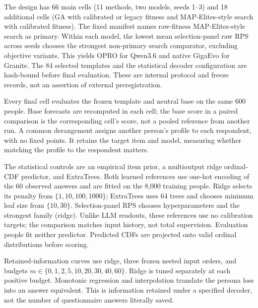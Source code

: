 \documentclass[10pt,twocolumn]{article}
\begin{document}
The design has 66 main cells (11 methods, two models, seeds 1--3) and 18
additional cells (GA with calibrated or legacy fitness and MAP-Elites-style
search with calibrated fitness). The fixed manifest names raw-fitness
MAP-Elites-style search as primary. Within each model, the lowest mean
selection-panel raw RPS across seeds chooses the strongest non-primary search
comparator, excluding objective variants. This yields OPRO for Qwen3.6 and
native GigaEvo for Granite. The 84 selected templates and the statistical
decoder configuration are hash-bound before final evaluation. These are
internal protocol and freeze records, not an assertion of external
preregistration.

Every final cell evaluates the frozen template and neutral base on the same
600 people. Base forecasts are recomputed in each cell; the base score in a
paired comparison is the corresponding cell's score, not a pooled reference
from another run. A common derangement assigns another person's profile to
each respondent, with no fixed points. It retains the target item and model,
measuring whether matching the profile to the respondent matters.

The statistical controls are an empirical item prior, a multioutput ridge
ordinal-CDF predictor, and ExtraTrees. Both learned references use one-hot
encoding of the 60 observed answers and are fitted on the 8,000 training
people. Ridge selects its penalty from $\{1,10,100,1000\}$; ExtraTrees uses
64 trees and chooses minimum leaf size from $\{10,30\}$. Selection-panel RPS
chooses hyperparameters and the strongest family (ridge). Unlike LLM readouts,
these references use no calibration targets; the comparison matches input
history, not total supervision. Evaluation people fit neither predictor.
Predicted CDFs are projected onto valid ordinal distributions before scoring.

Retained-information curves use ridge, three frozen nested input orders,
and budgets $m\in\{0,1,2,5,10,20,30,40,60\}$. Ridge is tuned separately at
each positive budget. Monotonic regression and interpolation translate the
persona loss into an answer equivalent. This is information retained under
a specified decoder, not the number of questionnaire answers literally saved.
\end{document}
